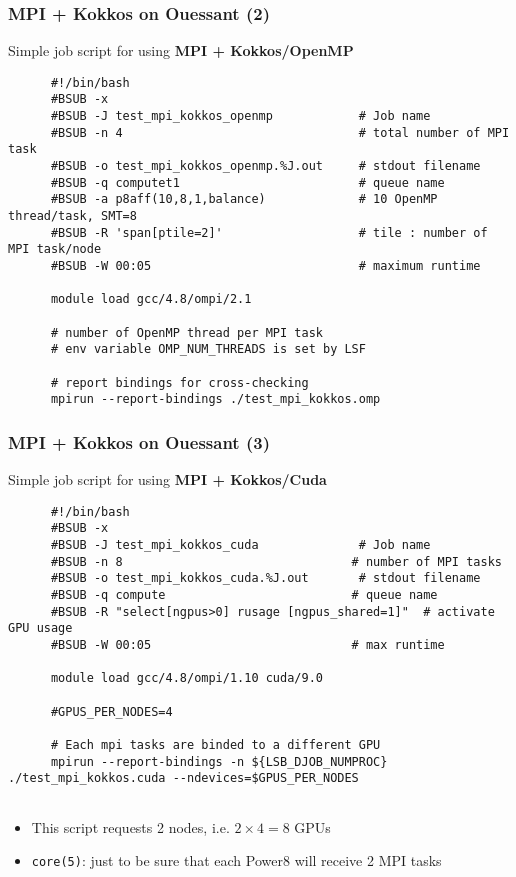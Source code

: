 \begin{frame}[fragile=singleslide]
  \frametitle{MPI + Kokkos on Ouessant (2)}

  {\Large Simple job script for using \textbf{MPI + Kokkos/OpenMP}}

  {\small
    \begin{verbatim}
      #!/bin/bash
      #BSUB -x
      #BSUB -J test_mpi_kokkos_openmp            # Job name
      #BSUB -n 4                                 # total number of MPI task
      #BSUB -o test_mpi_kokkos_openmp.%J.out     # stdout filename
      #BSUB -q computet1                         # queue name
      #BSUB -a p8aff(10,8,1,balance)             # 10 OpenMP thread/task, SMT=8
      #BSUB -R 'span[ptile=2]'                   # tile : number of MPI task/node
      #BSUB -W 00:05                             # maximum runtime
            
      module load gcc/4.8/ompi/2.1
      
      # number of OpenMP thread per MPI task
      # env variable OMP_NUM_THREADS is set by LSF
      
      # report bindings for cross-checking
      mpirun --report-bindings ./test_mpi_kokkos.omp
    \end{verbatim}
  }
\end{frame}

\begin{frame}[fragile=singleslide]
  \frametitle{MPI + Kokkos on Ouessant (3)}

  {\Large Simple job script for using \textbf{MPI + Kokkos/Cuda}}

  {\scriptsize
    \begin{verbatim}
      #!/bin/bash
      #BSUB -x
      #BSUB -J test_mpi_kokkos_cuda              # Job name
      #BSUB -n 8                                # number of MPI tasks
      #BSUB -o test_mpi_kokkos_cuda.%J.out       # stdout filename
      #BSUB -q compute                          # queue name
      #BSUB -R "select[ngpus>0] rusage [ngpus_shared=1]"  # activate GPU usage
      #BSUB -W 00:05                            # max runtime
            
      module load gcc/4.8/ompi/1.10 cuda/9.0
      
      #GPUS_PER_NODES=4
      
      # Each mpi tasks are binded to a different GPU
      mpirun --report-bindings -n ${LSB_DJOB_NUMPROC} ./test_mpi_kokkos.cuda --ndevices=$GPUS_PER_NODES
      
    \end{verbatim}
  }
  \begin{itemize}
    \item This script requests 2 nodes, i.e. $2\times4=8$ GPUs
  \item \texttt{core(5)}: just to be sure that each Power8 will receive 2 MPI tasks
  \end{itemize}
\end{frame}

